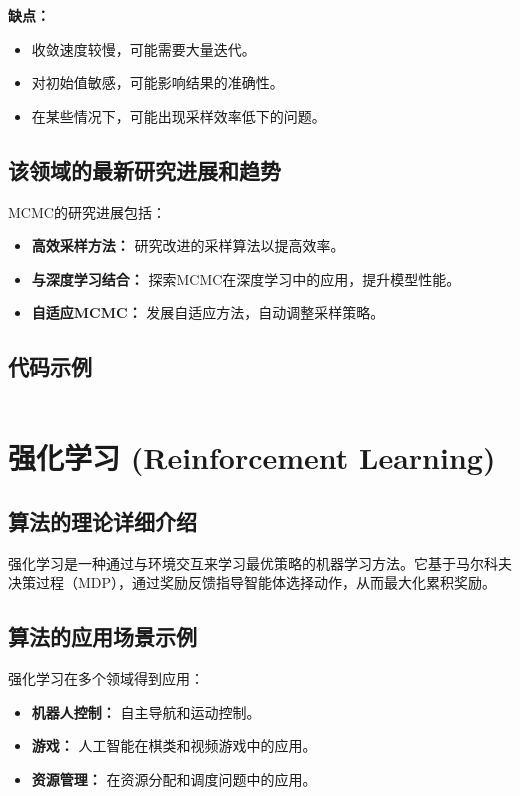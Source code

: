 \textbf{缺点：}
\begin{itemize}
    \item 收敛速度较慢，可能需要大量迭代。
    \item 对初始值敏感，可能影响结果的准确性。
    \item 在某些情况下，可能出现采样效率低下的问题。
\end{itemize}

\subsection*{该领域的最新研究进展和趋势}
MCMC的研究进展包括：
\begin{itemize}
    \item \textbf{高效采样方法：} 研究改进的采样算法以提高效率。
    \item \textbf{与深度学习结合：} 探索MCMC在深度学习中的应用，提升模型性能。
    \item \textbf{自适应MCMC：} 发展自适应方法，自动调整采样策略。
\end{itemize}
\subsection*{代码示例}
\begin{lstlisting}

\end{lstlisting}


\section{强化学习 (Reinforcement Learning)}
\subsection*{算法的理论详细介绍}
强化学习是一种通过与环境交互来学习最优策略的机器学习方法。它基于马尔科夫决策过程（MDP），通过奖励反馈指导智能体选择动作，从而最大化累积奖励。

\subsection*{算法的应用场景示例}
强化学习在多个领域得到应用：
\begin{itemize}
    \item \textbf{机器人控制：} 自主导航和运动控制。
    \item \textbf{游戏：} 人工智能在棋类和视频游戏中的应用。
    \item \textbf{资源管理：} 在资源分配和调度问题中的应用。
\end{itemize}

